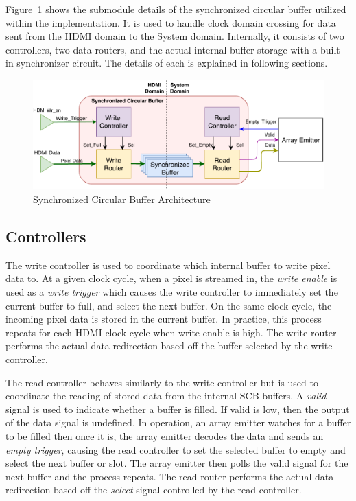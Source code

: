     Figure~\ref{fig:scb_arch} shows the submodule details of the synchronized circular buffer utilized within the implementation. It is used to handle clock domain crossing for data sent from the HDMI domain to the System domain. Internally, it consists of two controllers, two data routers, and the actual internal buffer storage with a built-in synchronizer circuit. The details of each is explained in following sections.

    \begin{figure}
        \centering
        \includegraphics[width=1.0\textwidth]{fig/pdp_scb_arch.pdf}
        \caption{Synchronized Circular Buffer Architecture}
        \label{fig:scb_arch}
    \end{figure}

    \subsection{Controllers}
        The write controller is used to coordinate which internal buffer to write pixel data to. At a given clock cycle, when a pixel is streamed in, the {\it write enable} is used as a {\it write trigger} which causes the write controller to immediately set the current buffer to full, and select the next buffer. On the same clock cycle, the incoming pixel data is stored in the current buffer. In practice, this process repeats for each HDMI clock cycle when write enable is high. The write router performs the actual data redirection based off the buffer selected by the write controller.

        The read controller behaves similarly to the write controller but is used to coordinate the reading of stored data from the internal SCB buffers. A {\it valid} signal is used to indicate whether a buffer is filled. If valid is low, then the output of the data signal is undefined. In operation, an array emitter watches for a buffer to be filled then once it is, the array emitter decodes the data and sends an {\it empty trigger}, causing the read controller to set the selected buffer to empty and select the next buffer or slot. The array emitter then polls the valid signal for the next buffer and the process repeats. The read router performs the actual data redirection based off the {\it select} signal controlled by the read controller.


